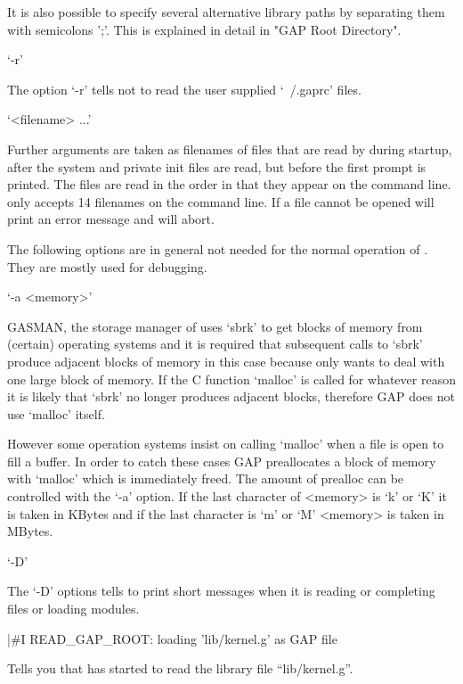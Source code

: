 It  is  also possible  to  specify several  alternative library  paths by
separating them  with semicolons  ';'.  This is explained  in detail in
"GAP Root Directory".

`-r'

The option `-r'  tells {\GAP}  not to  read the user  supplied `~/.gaprc'
files.

`<filename> ...'

Further arguments are taken as filenames of files that are read by {\GAP}
during startup, after the system  and private init   files are read,  but
before the first prompt is  printed.  The files are read  in the order in
that they  appear on the command line.   {\GAP} only accepts 14 filenames
on the command  line.  If a  file cannot  be opened {\GAP}  will print an
error message and will abort.


The following options are in general not needed  for the normal operation
of {\GAP}.  They are mostly used for debugging.

`-a <memory>' 

GASMAN, the storage manager of {\GAP} uses `sbrk' to get blocks of memory
from (certain) operating systems and it is required that subsequent calls
to `sbrk' produce  adjacent blocks of memory  in this case because {\GAP}
only wants to  deal with one large  block  of memory.  If the  C function
`malloc' is called for whatever reason it is likely that `sbrk' no longer
produces adjacent blocks, therefore GAP does not use `malloc' itself.

However some operation systems insist on calling `malloc'  when a file is
open to fill a buffer.  In order to catch these  cases GAP preallocates a
block of memory with  `malloc' which is immediately  freed. The amount of
prealloc can be  controlled with the  `-a' option.  If the last character
of <memory> is `k' or `K' it is taken in KBytes and if the last character
is `m' or `M' <memory> is taken in MBytes.

`-D'

The `-D' options tells {\GAP} to print short  messages when it is reading
or completing files or loading modules.

\begintt
    |#I  READ_GAP_ROOT: loading 'lib/kernel.g' as GAP file
\endtt

Tells   you  that   {\GAP}  has  started    to  read the   library   file
``lib/kernel.g''.


